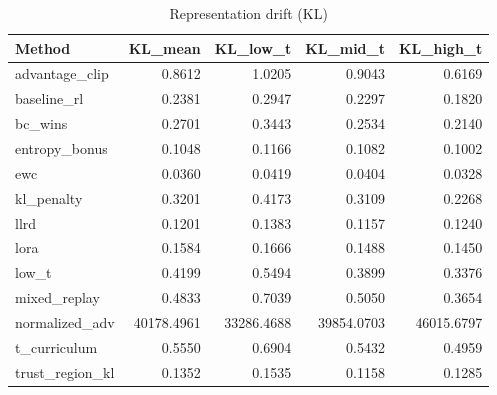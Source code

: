 \begin{table}[htbp]
\centering
\caption{Representation drift (KL)}
\label{tab:repr-drift}
\begin{tabular}{lrrrr}
\toprule
\textbf{Method} & \textbf{KL\_mean} & \textbf{KL\_low\_t} & \textbf{KL\_mid\_t} & \textbf{KL\_high\_t} \\
\midrule
advantage\_clip & 0.8612 & 1.0205 & 0.9043 & 0.6169 \\
baseline\_rl & 0.2381 & 0.2947 & 0.2297 & 0.1820 \\
bc\_wins & 0.2701 & 0.3443 & 0.2534 & 0.2140 \\
entropy\_bonus & 0.1048 & 0.1166 & 0.1082 & 0.1002 \\
ewc & 0.0360 & 0.0419 & 0.0404 & 0.0328 \\
kl\_penalty & 0.3201 & 0.4173 & 0.3109 & 0.2268 \\
llrd & 0.1201 & 0.1383 & 0.1157 & 0.1240 \\
lora & 0.1584 & 0.1666 & 0.1488 & 0.1450 \\
low\_t & 0.4199 & 0.5494 & 0.3899 & 0.3376 \\
mixed\_replay & 0.4833 & 0.7039 & 0.5050 & 0.3654 \\
normalized\_adv & 40178.4961 & 33286.4688 & 39854.0703 & 46015.6797 \\
t\_curriculum & 0.5550 & 0.6904 & 0.5432 & 0.4959 \\
trust\_region\_kl & 0.1352 & 0.1535 & 0.1158 & 0.1285 \\
\bottomrule
\end{tabular}
\end{table}